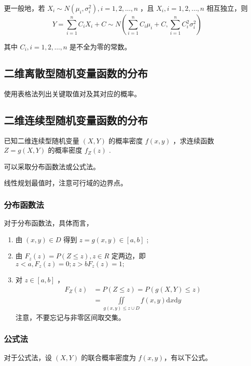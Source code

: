 更一般地，若 $ X_i\sim N(\mu_i,\sigma_i^2),i=1,2,\dots,n $ ，且 $ X_i,i=1,2,\dots,n $ 相互独立，则
$$
    Y = \sum_{i=1}^n C_iX_i + C \sim N(\sum_{i=1}^nC_i\mu_i+C,\sum_{i=1}^nC_i^2\sigma_i^2)
$$ 

其中 $ C_i,i=1,2,\dots,n $ 是不全为零的常数。

\subsection{二维离散型随机变量函数的分布}

使用表格法列出关键取值对及其对应的概率。

\subsection{二维连续型随机变量函数的分布}

已知二维连续型随机变量 $ (X,Y) $ 的概率密度 $ f(x,y) $ ，求连续函数 $ Z = g(X,Y) $ 的概率密度 $ f_Z(z) $ .

可以采取分布函数法或公式法。

线性规划最值时，注意可行域的边界点。

\subsubsection{分布函数法}

对于分布函数法，具体而言，\begin{enumerate}
    \item 由 $ (x,y)\in D $ 得到 $ z = g(x,y) \in [a,b] $ ;
    \item 由 $ F_z(z) = P(Z\leq z),z\in R $ 定两边，即
    $ z<a, F_z(z) = 0; z>b F_z(z) = 1; $ 
    \item 对 $ z\in [a,b] $ ，\begin{equation*}
        \begin{aligned}
            F_Z(z) &= P(Z\leq z) = P(g(X,Y)\leq z)
            \\&= \iint\limits_{g(x,y)\leq z \cup D}f(x,y)\mathrm{d}x\mathrm{d}y
        \end{aligned}
    \end{equation*}
    注意，不要忘记与非零区间取交集。
\end{enumerate}

\subsubsection{公式法}

对于公式法，设 $ (X,Y) $ 的联合概率密度为 $ f(x,y) $，有以下公式。

